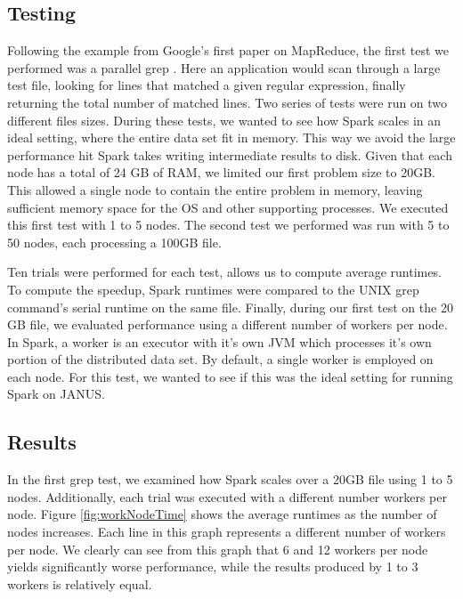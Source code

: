 \documentclass{article}
\begin{document}
\subsection{Testing}
Following the example from Google's first paper on MapReduce, the first test we
performed was a parallel grep \citep{dean-mapreduce}. Here an application would
scan through a large test file, looking for lines that matched a given regular
expression, finally returning the total number of matched lines. Two series of
tests were run on two different files sizes. During these tests, we wanted to
see how Spark scales in an ideal setting, where the entire data set fit in
memory. This way we avoid the large performance hit Spark takes writing
intermediate results to disk. Given that each node has a total of 24 GB of RAM,
we limited our first problem size to 20GB. This allowed a single node to
contain the entire problem in memory, leaving sufficient memory space for the
OS and other supporting processes. We executed this first test with 1 to 5
nodes. The second test we performed was run with 5 to 50 nodes, each processing
a 100GB file.

Ten trials were performed for each test, allows us to compute average
runtimes. To compute the speedup, Spark runtimes were compared to the UNIX grep
command's serial runtime on the same file. Finally, during our first test on the
20 GB file, we evaluated performance using a different number of workers per
node. In Spark, a worker is an executor with it's own JVM which processes it's
own portion of the distributed data set. By default, a single worker is
employed on each node. For this test, we wanted to see if this was the ideal
setting for running Spark on JANUS.


\subsection{Results}
In the first grep test, we examined how Spark scales over a 20GB file using 1
to 5 nodes. Additionally, each trial was executed with a different number
workers per node. Figure \ref{fig:workNodeTime} shows the average runtimes as
the number of nodes increases. Each line in this graph represents a different
number of workers per node. We clearly can see from this graph that 6 and 12
workers per node yields significantly worse performance, while the results
produced by 1 to 3 workers is relatively equal.
\end{document}

